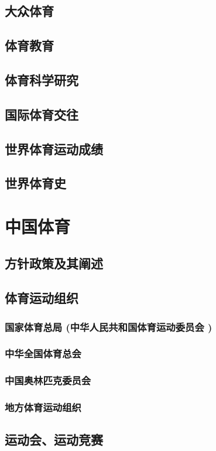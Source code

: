 \documentclass[UTF8]{../../ApplicationUniverse}
\begin{document}
    \subsection{大众体育}
    \subsection{体育教育}
    \subsection{体育科学研究}
    \subsection{国际体育交往}
    \subsection{世界体育运动成绩}
    \subsection{世界体育史}


\section{中国体育}
    \subsection{方针政策及其阐述}
    \subsection{体育运动组织}
        \subsubsection{国家体育总局 (中华人民共和国体育运动委员会 )}
        \subsubsection{中华全国体育总会}
        \subsubsection{中国奥林匹克委员会}
        \subsubsection{地方体育运动组织}
    \subsection{运动会、运动竞赛}
\end{document}
